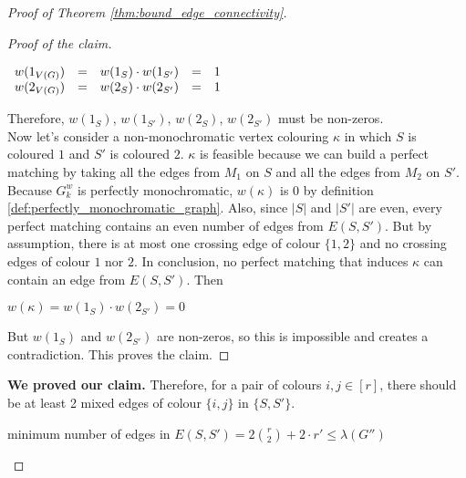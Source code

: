 \begin{proof}[Proof of Theorem \ref{thm:bound_edge_connectivity}]
\begin{enumerate}
\begin{enumerate}
\begin{proof}[Proof of the claim]
                        \begin{center}
                            $\begin{array}{l c l c l}
                                w(1_{V(G)}) & = & w(1_S) \cdot w(1_{S'}) & = & 1 \\
                                w(2_{V(G)}) & = & w(2_S) \cdot w(2_{S'}) & = & 1
                            \end{array}$
                        \end{center}
                        
                        Therefore, $w(1_S)$, $w(1_{S'})$, $w(2_S)$, $w(2_{S'})$ must be non-zeros. \\

                        Now let's consider a non-monochromatic vertex colouring $\kappa$ in which $S$ is coloured $1$ and $S'$ is coloured $2$. $\kappa$ is feasible because we can build a perfect matching by taking all the edges from $M_1$ on $S$ and all the edges from $M_2$ on $S'$. Because $G_k^w$ is perfectly monochromatic, $w(\kappa)$ is 0 by definition \ref{def:perfectly_monochromatic_graph}. Also, since $|S|$ and $|S'|$ are even, every perfect matching contains an even number of edges from $E(S, S')$. But by assumption, there is at most one crossing edge of colour $\{1, 2\}$ and no crossing edges of colour $1$ nor $2$. In conclusion, no perfect matching that induces $\kappa$ can contain an edge from $E(S, S')$. Then
                        
                        \begin{center}
                            $w(\kappa) = w(1_S) \cdot w(2_{S'}) = 0$
                        \end{center}
                        
                        But $w(1_S)$ and $w(2_{S'})$ are non-zeros, so this is impossible and creates a contradiction. This proves the claim.
                    \end{proof}

                    \textbf{We proved our claim.} Therefore, for a pair of colours $i, j \in [r]$, there should be at least 2 mixed edges of colour $\{i, j\}$ in $\{S, S'\}$. 
                    
                    \begin{center}
                        minimum number of edges in $E(S, S') = 2 {r \choose 2} + 2 \cdot r' \leq \lambda(G'')$
                    \end{center}
                    

\end{enumerate}
\end{enumerate}
\end{proof}

